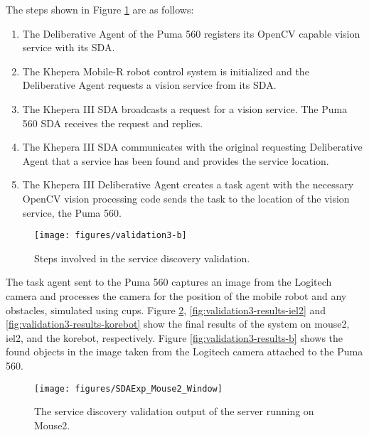     The steps shown in Figure \ref{fig:validation3-b} are as follows:
    \begin{enumerate}
    \item The Deliberative Agent of the Puma 560 registers its OpenCV capable 
            vision service with its SDA.
    \item The Khepera Mobile-R robot control system is initialized and the 
            Deliberative Agent requests a vision service from its SDA.
    \item The Khepera III SDA broadcasts a request for a vision service.  
          The Puma 560 SDA receives the request and replies.
    \item The Khepera III SDA communicates with the original requesting
            Deliberative Agent that a service has been found and provides the 
            service location.
    \item The Khepera III Deliberative Agent creates a task agent with the 
            necessary OpenCV vision processing code sends the task to the 
            location of the vision service, the Puma 560.
    \end{enumerate}
    \begin{figure}%
      \centerline{\texttt{[image: figures/validation3-b]}}
      \caption{Steps involved in the service discovery validation.}
      \label{fig:validation3-b}
    \end{figure}

    The task agent sent to the Puma 560 captures an image from the Logitech 
      camera and processes the camera for the position of the mobile robot and 
      any obstacles, simulated using cups.
    Figure \ref{fig:validation3-results-mouse2}, 
      \ref{fig:validation3-results-iel2} and 
      \ref{fig:validation3-results-korebot} show the final results of the 
      system on mouse2, iel2, and the korebot, respectively.
    Figure \ref{fig:validation3-results-b} shows the found objects in the image
      taken from the Logitech camera attached to the Puma 560.
    \begin{figure}%
      \begin{center}
      \texttt{[image: figures/SDAExp\_Mouse2\_Window]}
      \end{center}
      \caption{The service discovery validation output of the server running on Mouse2.}
      \label{fig:validation3-results-mouse2}
    \end{figure}

